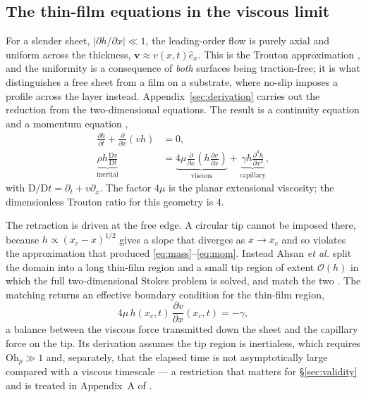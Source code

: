 \documentclass[11pt,a4paper]{article}
\newcommand{\Ohp}{\mathrm{Oh}_{p}}
\begin{document}
\subsection{The thin-film equations in the viscous limit}

For a slender sheet, $|\partial h/\partial x| \ll 1$, the leading-order flow is
purely axial and uniform across the thickness, $\mathbf{v} \approx v(x,t)
\hat{e}_{x}$. This is the Trouton approximation \cite{trouton1906}, and the
uniformity is a consequence of \emph{both} surfaces being traction-free; it is
what distinguishes a free sheet from a film on a substrate, where no-slip
imposes a profile across the layer instead. Appendix~\ref{sec:derivation}
carries out the reduction from the two-dimensional equations. The result is a
continuity equation and a momentum equation \cite{erneux1993,howell1996},
%
\begin{align}
  \frac{\partial h}{\partial t} + \frac{\partial}{\partial x}(v h) &= 0,
  \label{eq:mass} \\[2pt]
  \underbrace{\rho h \frac{\mathrm{D} v}{\mathrm{D} t}}_{\text{inertial}}
    &= \underbrace{4\mu \frac{\partial}{\partial x}
       \left( h \frac{\partial v}{\partial x} \right)}_{\text{viscous}}
     + \underbrace{\gamma h \frac{\partial^{3} h}{\partial x^{3}}}_{\text{capillary}},
  \label{eq:mom}
\end{align}
%
with $\mathrm{D}/\mathrm{D}t = \partial_{t} + v \partial_{x}$. The factor $4\mu$
is the planar extensional viscosity; the dimensionless Trouton ratio for
this geometry is $4$.

The retraction is driven at the free edge. A circular tip cannot be imposed
there, because $h \propto (x_{c}-x)^{1/2}$ gives a slope that diverges as
$x \to x_{c}$ and so violates the approximation that produced
\eqref{eq:mass}--\eqref{eq:mom}. Instead Ahsan \textit{et al.} \cite{ahsan2025} split the domain
into a long thin-film region and a small tip region of extent $\mathcal{O}(h)$
in which the full two-dimensional Stokes problem is solved, and match the two
\cite{ahsan2025,hinch1991}. The matching returns an effective boundary
condition for the thin-film region,
%
\begin{equation}
  4\mu\, h(x_{c},t)\, \frac{\partial v}{\partial x}(x_{c},t) = -\gamma,
  \label{eq:edge}
\end{equation}
%
a balance between the viscous force transmitted down the sheet and the capillary
force on the tip. Its derivation assumes the tip region is inertialess, which
requires $\Ohp \gg 1$ and, separately, that the elapsed time is not
asymptotically large compared with a viscous timescale --- a restriction that
matters for \S\ref{sec:validity} and is treated in Appendix~A of
\cite{ahsan2025}.
\end{document}

